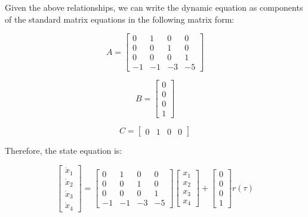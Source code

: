 \documentclass[12pt, letterpaper]{../assignment}
\begin{document}
Given the above relationships, we can write the dynamic equation as components of the standard matrix equations in the following matrix form:

\begin{equation*}
    A = \begin{bmatrix}
        0 & 1 & 0 & 0 \\
        0 & 0 & 1 & 0 \\
        0 & 0 & 0 & 1 \\
        -1 & -1 & -3 & -5
    \end{bmatrix}
\end{equation*}

\begin{equation*}
    B = \begin{bmatrix}
        0\\ 0\\ 0\\ 1
    \end{bmatrix}
\end{equation*}

\begin{equation*}
    C = \begin{bmatrix}
        0 & 1 & 0 & 0
    \end{bmatrix}
\end{equation*}

Therefore, the state equation is:

\begin{answer}
    \begin{equation*}
        \begin{bmatrix}
            \dot{x}_1\\ \dot{x}_2\\ \dot{x}_3\\ \dot{x}_4
        \end{bmatrix}=
        \begin{bmatrix}
            0 & 1 & 0 & 0 \\
            0 & 0 & 1 & 0 \\
            0 & 0 & 0 & 1 \\
            -1 & -1 & -3 & -5
        \end{bmatrix}
        \begin{bmatrix}
            x_1\\ x_2\\ x_3\\ x_4
        \end{bmatrix}
        + \begin{bmatrix}
            0\\ 0\\ 0\\ 1
        \end{bmatrix} r(\tau)
    \end{equation*}
\end{answer}
\end{document}
